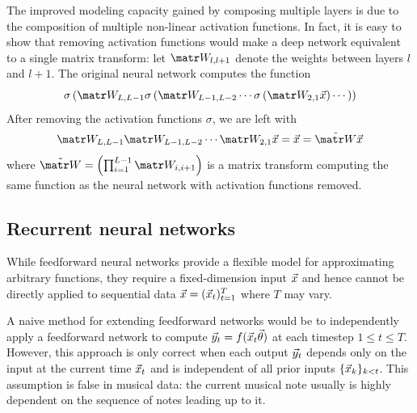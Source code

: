 The improved modeling capacity gained by composing multiple layers is due to
the composition of multiple non-linear activation functions.
In fact, it is easy to show that removing activation functions would make
a deep network equivalent to a single matrix transform: let $\W_{l,l+1}$
denote the weights between layers $l$ and $l+1$. The original neural network
computes the function
\begin{equation}
    \sigma\left(
        \W_{L,L-1} \sigma \left(
            \W_{L-1,L-2}\cdots \sigma \left(
                \W_{2,1} \x
            \right) \cdots
        \right)
    \right)
\end{equation}
After removing the activation functions $\sigma$, we are left with
\begin{equation}
    \W_{L,L-1} \W_{L-1,L-2}\cdots \W_{2,1} \x
    = \x
    = \tilde{\W} \x
\end{equation}
where $\tilde{\W} = \left(\prod_{i=1}^{L-1} \W_{i,i+1} \right)$
is a matrix transform computing the same function as the neural network with
activation functions removed.

\subsection{Recurrent neural networks}


While feedforward neural networks provide a flexible model for approximating
arbitrary functions, they require a fixed-dimension input $\vec{x}$ and hence
cannot be directly applied to sequential data $\vec{x} = (\vec{x}_t)_{t=1}^T$ where $T$ may
vary.

A naive method for extending feedforward networks would be to independently
apply a feedforward network to compute $\vec{y}_t = f(\vec{x}_t \vec{\theta})$ at each timestep
$1 \leq t \leq T$. However, this approach is only correct when each output
$\vec{y}_t$ depends only on the input at the current time $\vec{x}_t$ and is independent of
all prior inputs $\{\vec{x}_k\}_{k < t}$. This assumption is false in musical data:
the current musical note usually is highly dependent on the sequence of notes
leading up to it.

